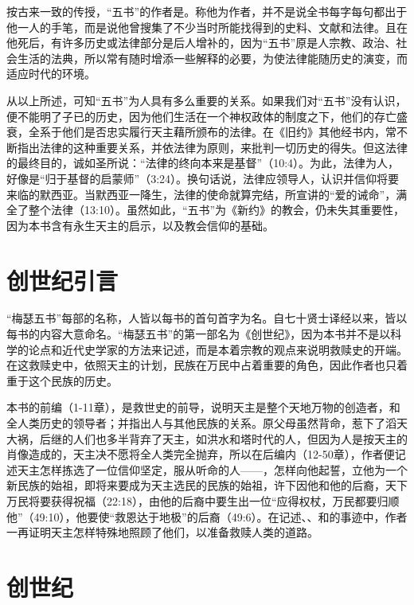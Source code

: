 按古来一致的传授，“五书”的作者是\UL[梅瑟]。称他为作者，并不是说全书每字每句都出于他一人的手笔，而是说他曾搜集了不少当时所能找得到的史料、文献和法律。且在他死后，有许多历史或法律部分是后人增补的，因为“五书”原是\UL[以色列]人宗教、政治、社会生活的法典，所以常有随时增添一些解释的必要，为使\UL[梅瑟]法律能随历史的演变，而适应时代的环境。

从以上所述，可知“五书”为\UL[以色列]人具有多么重要的关系。如果我们对“五书”没有认识，便不能明了\UL[以色列]子已的历史，因为他们生活在一个神权政体的制度之下，他们的存亡盛衰，全系于他们是否忠实履行天主藉\UL[梅瑟]所颁布的法律。在《旧约》其他经书内，常不断指出法律的这种重要关系，并依法律为原则，来批判一切历史的得失。但这法律的最终目的，诚如圣\UL[保禄]所说：“法律的终向本来是基督”（10:4）。为此，法律为\UL[以色列]人，好像是“归于基督的启蒙师”（3:24）。换句话说，法律应领导\UL[以色列]人，认识并信仰将要来临的默西亚。当默西亚\UL[耶稣]\UL[基督]一降生，法律的使命就算完结，\UL[耶稣]所宣讲的“爱的诫命”，满全了整个法律（13:10）。虽然如此，“五书”为《新约》的教会，仍未失其重要性，因为本书含有永生天主的启示，以及教会信仰的基础。


\chapter*{创世纪引言}
“梅瑟五书”每部的名称，\UL[犹太]人皆以每书的首句首字为名。自\UL[希腊]七十贤士译经以来，皆以每书的内容大意命名。“梅瑟五书”的第一部名为《创世纪》，因为本书并不是以科学的论点和近代史学家的方法来记述，而是本着宗教的观点来说明救赎史的开端。在这救赎史中，依照天主的计划，\UL[以色列]民族在万民中占着重要的角色，因此作者也只着重于这个民族的历史。

本书的前编（1-11章），是救世史的前导，说明天主是整个天地万物的创造者，和全人类历史的领导者；并指出\UL[以色列]人与其他民族的关系。原父母虽然背命，惹下了滔天大祸，后继的人们也多半背弃了天主，如洪水和\UL[巴贝耳]塔时代的人，但因为人是按天主的肖像造成的，天主决不愿将全人类完全抛弃，所以在后编内（12-50章），作者便记述天主怎样拣选了一位信仰坚定，服从听命的人——\UL[亚巴郎]，怎样向他起誓，立他为一个新民族的始祖，即将来要成为天主选民的民族的始祖，许下因他和他的后裔，天下万民将要获得祝福（22:18），由他的后裔中要生出一位“应得权杖，万民都要归顺他”（49:10），他要使“救恩达于地极”的后裔（49:6）。在记述\UL[亚巴郎]、\UL[依撒格]、\UL[雅各伯]和\UL[若瑟]的事迹中，作者一再证明天主怎样特殊地照顾了他们，以准备救赎人类的道路。


\chapter{创世纪}



